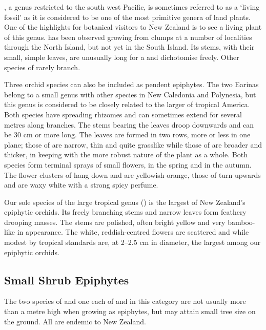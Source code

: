 , a genus restricted to the south west Pacific, is sometimes referred to as a `living fossil' as it is considered to be one of the most primitive genera of land plants.
One of the highlights for botanical visitors to New Zealand is to see a living plant of this genus.  has been observed growing from  clumps at a number of localities through the North Island, but not yet in the South Island.
Its stems, with their small, simple leaves, are unusually long for a  and dichotomise freely.
Other species of  rarely branch.

Three orchid species can also be included as pendent epiphytes.
The two Earinas belong to a small genus with other species in New Caledonia and Polynesia, but this genus is considered to be closely related to the larger  of tropical America.
Both species have spreading rhizomes and can sometimes extend for several metres along branches.
The stems bearing the leaves droop downwards and can be 30 cm or more long.
The leaves are formed in two rows, more or less in one plane; those of  are narrow, thin and quite grasslike while those of  are broader and thicker, in keeping with the more robust nature of the plant as a whole.
Both species form terminal sprays of small flowers,  in the spring and  in the autumn.
The flower clusters of  hang down and are yellowish orange, those of  turn upwards and are waxy white with a strong spicy perfume.

Our sole species of the large tropical genus  () is the largest of New Zealand's epiphytic orchids.
Its freely branching stems and narrow leaves form feathery drooping masses.
The stems are polished, often bright yellow and very bamboo-like in appearance.
The white, reddish-centred flowers are scattered and while modest by tropical standards are, at 2--2.5 cm in diameter, the largest among our epiphytic orchids.

\subsection{Small Shrub Epiphytes}

The two species of  and one each of  and  in this category are not usually more than a metre high when growing as epiphytes, but may attain small tree size on the ground.
All are endemic to New Zealand.

